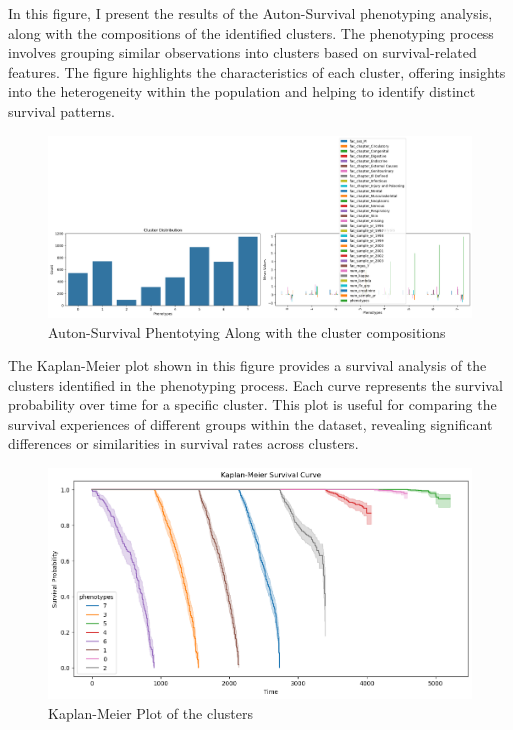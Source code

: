 \noindent In this figure, I present the results of the Auton-Survival phenotyping analysis, along with the compositions of the identified clusters. The phenotyping process involves grouping similar observations into clusters based on survival-related features. The figure highlights the characteristics of each cluster, offering insights into the heterogeneity within the population and helping to identify distinct survival patterns.
\begin{figure}[h]
    \centering
    \includegraphics[scale=0.3]{Figures/EDA/clusters.png}
    \caption{Auton-Survival Phentotying Along with the cluster compositions}
    \label{fig:your_label}
\end{figure}
\clearpage
\noindent The Kaplan-Meier plot shown in this figure provides a survival analysis of the clusters identified in the phenotyping process. Each curve represents the survival probability over time for a specific cluster. This plot is useful for comparing the survival experiences of different groups within the dataset, revealing significant differences or similarities in survival rates across clusters.
\begin{figure}[h]
    \centering
    \includegraphics[scale=0.30]{Figures/EDA/cluster_kaplan.png}
    \caption{Kaplan-Meier Plot of the clusters}
    \label{fig:your_label}
\end{figure}

